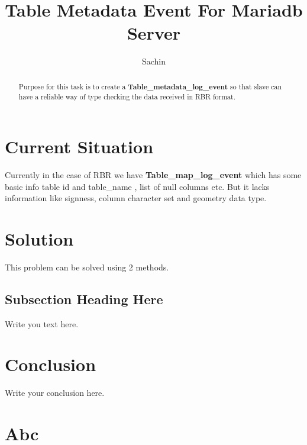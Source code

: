 \documentclass{article}
\begin{document}
\title{Table Metadata Event For Mariadb Server}
\author{Sachin}

\maketitle

\begin{abstract}
Purpose for this task is to create a \textbf{Table\_metadata\_log\_event} so that slave can
have a reliable way of type checking the data received in RBR format. 
\end{abstract}

\section{Current Situation}
Currently in the case of RBR we have \textbf{Table\_map\_log\_event} which has some basic info
table id and table\_name , list of null columns etc. But it lacks information like signness,
column character set and geometry data type.

\section{Solution}
This problem can be solved using 2 methods.


\subsection{Subsection Heading Here}
Write you text here.

\section{Conclusion}
Write your conclusion here.

\section{Abc}
\end{document}

